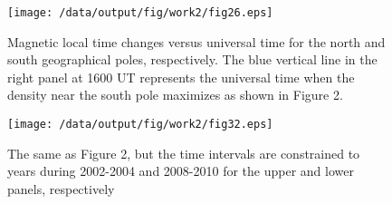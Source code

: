 \documentclass[draft,grl]{/home/gdj/文档/template/agu_template/AGUTeX}
\begin{document}
\begin{figure}
    \centering
    \noindent\texttt{[image: /data/output/fig/work2/fig26.eps]}
    \caption{ Magnetic local time changes versus universal time for the north and south geographical poles, respectively. The blue vertical line in the right panel at 1600 UT represents the universal time when the density near the south pole maximizes as shown in Figure 2.}
    \label{figure3}
\end{figure}
\begin{figure}
    \centering
    \noindent\texttt{[image: /data/output/fig/work2/fig32.eps]}
    \caption{The same as Figure 2, but the time intervals are constrained to years during 2002-2004 and 2008-2010 for the upper and lower panels, respectively}
    \label{figure4}
\end{figure}

\end{document}
